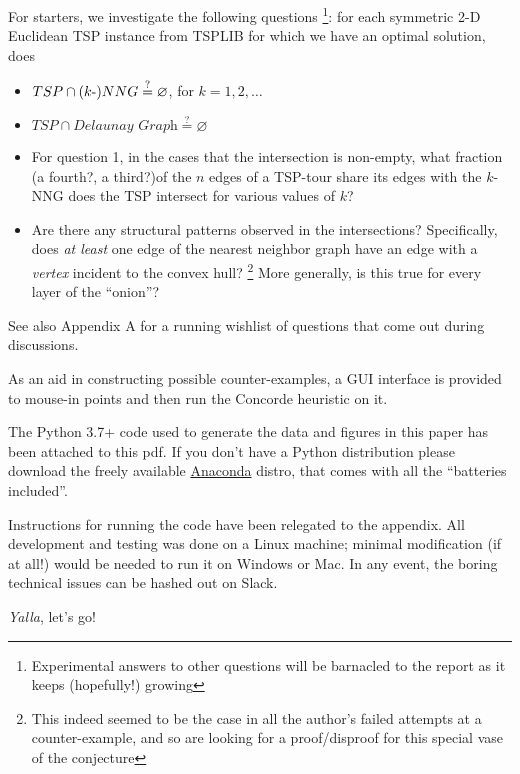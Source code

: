 \begin{description}
\newpage

     For starters,  we investigate the following questions \footnote{Experimental answers to other questions will be barnacled to the report as it keeps (hopefully!) growing}: 
     for each symmetric 2-D Euclidean TSP instance from TSPLIB for which we have an optimal solution, does

     \begin{itemize}
     \item $TSP \cap (k{\text -})NNG \stackrel{?}{=} \varnothing$, for $k=1,2,\ldots$
     \item $TSP \cap \textit{Delaunay Graph} \stackrel{?}{=} \varnothing$
     \item For question 1, in the cases that the intersection is non-empty, what fraction (a fourth?, a third?)of the $n$ 
           edges of a TSP-tour share its edges with the  $k$-NNG does the TSP intersect for various values of $k$? 
     \item Are there any structural patterns observed in the intersections? Specifically, does \textit{at least } 
           one edge of the nearest neighbor graph have an edge with a \textit{vertex} incident to the convex hull? \footnote{This indeed seemed to be the case in all the author's failed attempts at a counter-example, and so are looking for a proof/disproof for this special vase of the conjecture}
           More generally, is this true for every layer of the ``onion''?
     \end{itemize}

     See also Appendix A for a running wishlist of questions that come out during discussions. 

     As an aid in constructing possible counter-examples, a GUI interface is provided to mouse-in points and then 
     run the Concorde heuristic on it. 
     
     The Python 3.7+ code used to generate the data and figures in this paper has been attached to this pdf. If you don't have a Python distribution 
     please download the freely available  \href{https://www.anaconda.com/products/individual}{Anaconda}  distro, that comes 
     with all the ``batteries included''.

     Instructions for running the code have been relegated to the appendix. All development and testing was done on  a Linux machine;
     minimal modification (if at all!) would be needed to run it on  Windows or Mac. In any event, the boring technical issues can 
     be hashed out on Slack. 
     
     \textit{Yalla}, let’s go! 
\end{description}
